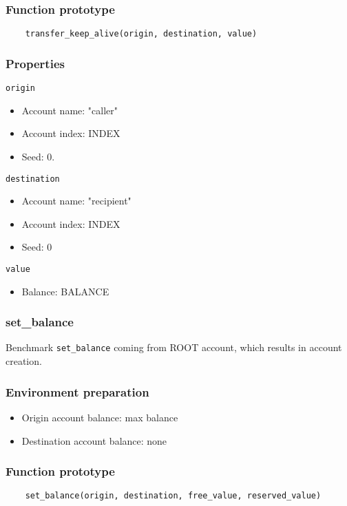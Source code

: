 \documentclass[11pt,a4paper]{article}
\begin{document}
\subsubsection*{Function prototype}
\begin{verbatim}
    transfer_keep_alive(origin, destination, value)
\end{verbatim}

\subsubsection*{Properties}
\verb|origin|
\begin{itemize}
\item Account name: "caller"
\item Account index: INDEX
\item Seed: 0.
\end{itemize}
\verb|destination|
\begin{itemize}
\item Account name: "recipient"
\item Account index: INDEX
\item Seed: 0
\end{itemize}
\verb|value|
\begin{itemize}
\item Balance: BALANCE
\end{itemize}

\subsubsection{set\_balance}

Benchmark \verb|set_balance| coming from ROOT account, which results in account creation.

\subsubsection*{Environment preparation}
\begin{itemize}
\item Origin account balance: max balance
\item Destination account balance: none
\end{itemize}

\subsubsection*{Function prototype}
\begin{verbatim}
    set_balance(origin, destination, free_value, reserved_value)
\end{verbatim}
\end{document}
